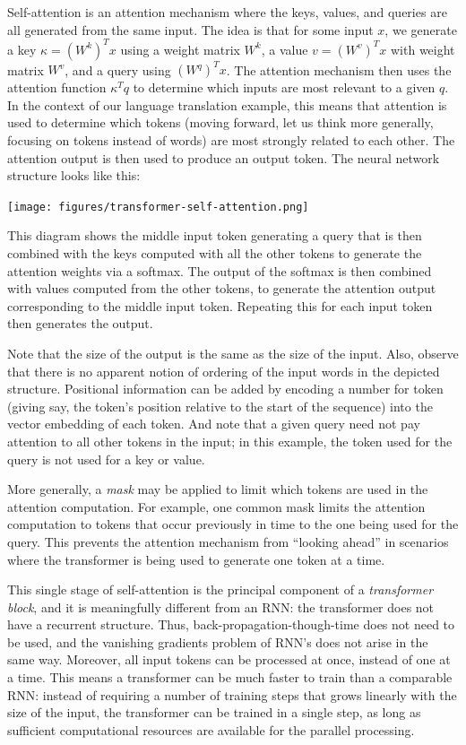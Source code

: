 Self-attention is an attention mechanism where the keys, values, and queries are all generated from the same input.  The idea is that for some input $x$, we generate a key $\kappa = (W^k)^T x$ using a weight matrix $W^k$, a value $v = (W^v)^T x$ with weight matrix $W^v$, and a query using $(W^q)^T x$.  The attention mechanism then uses the attention function $\kappa^T q$ to determine which inputs are most relevant to a given $q$.  In the context of our language translation example, this means that attention is used to determine which tokens (moving forward, let us think more generally, focusing on tokens instead of words) are most strongly related to each other.  The attention output is then used to produce an output token.  The neural network structure looks like this:
\begin{center}
\texttt{[image: figures/transformer-self-attention.png]}
\end{center}
This diagram shows the middle input token generating a query that is then combined with the keys computed with all the other tokens to generate the attention weights via a softmax.  The output of the softmax is then combined with values computed from the other tokens, to generate the attention output corresponding to the middle input token.  Repeating this for each input token then generates the output.

Note that the size of the output is the same as the size of the input.  Also, observe that there is no apparent notion of ordering of the input words in the depicted structure.  Positional information can be added by encoding a number for token (giving say, the token's position relative to the start of the sequence) into the vector embedding of each token.  And note that a given query need not pay attention to all other tokens in the input; in this example, the token used for the query is not used for a key or value.

More generally, a {\em mask} may be applied to limit which tokens are used in the attention computation.  For example, one common mask limits the attention computation to tokens that occur previously in time to the one being used for the query.  This prevents the attention mechanism from ``looking ahead'' in scenarios where the transformer is being used to generate one token at a time.

This single stage of self-attention is the principal component of a {\em transformer block}, and it is meaningfully different from an RNN: the transformer does not have a recurrent structure.  Thus, back-propagation-though-time does not need to be used, and the vanishing gradients problem of RNN's does not arise in the same way.  Moreover, all input tokens can be processed at once, instead of one at a time.  This means a transformer can be much faster to train than a comparable RNN: instead of requiring a number of training steps that grows linearly with the size of the input, the transformer can be trained in a single step, as long as sufficient computational resources are available for the parallel processing.

